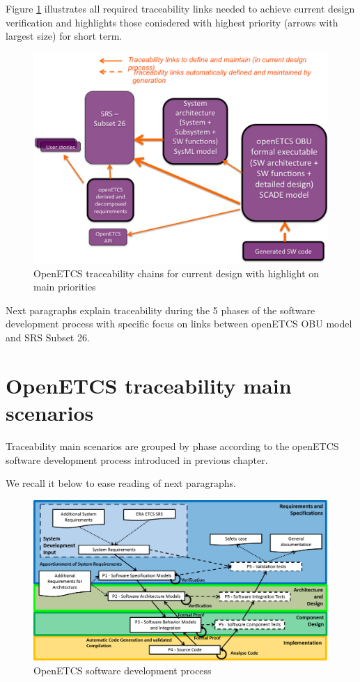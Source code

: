 \documentclass[11pt]{template/openetcs_report}
\begin{document}
Figure \ref{fig:openETCSTraceabilityMainPriority} illustrates all required traceability links needed to achieve current design verification and highlights those conisdered with highest priority (arrows with largest size) for short term.

\begin{figure}[htbp]
\centering
\includegraphics[width=.9\linewidth]
{./images/openETCSTraceabilityMainPriority.png}
\caption{\label{fig:openETCSTraceabilityMainPriority}OpenETCS traceability chains for current design with highlight on main priorities}
\end{figure}

Next paragraphs explain traceability during the 5 phases of the software development process with specific focus on links between openETCS OBU model and SRS Subset 26.


\section{OpenETCS traceability main scenarios}
Traceability main scenarios are grouped by phase according to the openETCS software development process introduced in previous chapter. 

We recall it below to ease reading of next paragraphs.

\begin{figure} [htbp]
\centering
\includegraphics[width=.9\linewidth]
{./images/OpenETCSDevelopmentProcess.png}
\caption{\label{fig:OpenETCSDevelopmentProcess}OpenETCS software development process}
\end{figure} 
\end{document}
